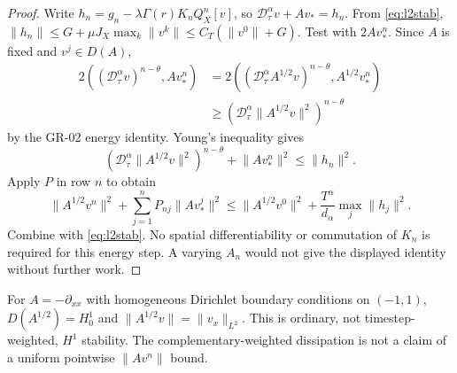 \documentclass[11pt,a4paper]{article}
\newcommand{\norm}[1]{\lVert#1\rVert}
\newcommand{\D}{\mathcal D_\tau^\alpha}
\newcommand{\ip}[2]{(#1,#2)}
\begin{document}
\begin{proof}
Write $h_n=g_n-\lambda\Gamma(r)K_n Q_X^n[v]$, so $\D v+Av_*=h_n$. From \eqref{eq:l2stab}, $\norm{h_n}\le G+\mu J_X\max_k\norm{v^k}\le C_T(\norm{v^0}+G)$. Test with $2Av_*^n$. Since $A$ is fixed and $v^j\in D(A)$,
\begin{align*}
 2\ip{(\D v)^{n-\theta}}{Av_*^n}
 &=2\ip{(\D A^{1/2}v)^{n-\theta}}{A^{1/2}v_*^n}\\
 &\ge (\D\norm{A^{1/2}v}^2)^{n-\theta}
\end{align*}
by the GR-02 energy identity. Young's inequality gives
\[
 (\D\norm{A^{1/2}v}^2)^{n-\theta}+\norm{Av_*^n}^2\le\norm{h_n}^2.
\]
Apply $P$ in row $n$ to obtain
\begin{equation}\label{eq:dissipation}
 \norm{A^{1/2}v^n}^2+\sum_{j=1}^nP_{nj}\norm{Av_*^j}^2
 \le \norm{A^{1/2}v^0}^2+\frac{T^\alpha}{d_\alpha}\max_j\norm{h_j}^2.
\end{equation}
Combine with \eqref{eq:l2stab}. No spatial differentiability or commutation of $K_n$ is required for this energy step. A varying $A_n$ would not give the displayed identity without further work.
\end{proof}
For $A=-\partial_{xx}$ with homogeneous Dirichlet boundary conditions on $(-1,1)$, $D(A^{1/2})=H_0^1$ and $\norm{A^{1/2}v}=\norm{v_x}_{L^2}$. This is ordinary, not timestep-weighted, $H^1$ stability. The complementary-weighted dissipation is not a claim of a uniform pointwise $\norm{Av^n}$ bound.
\end{document}
